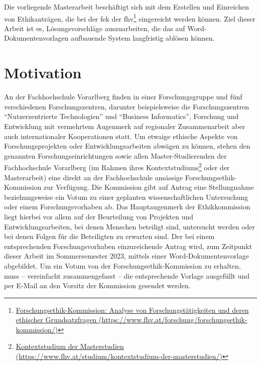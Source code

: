 \documentclass[a4paper,12pt,twoside]{scrreprt}
\begin{document}
Die vorliegende Masterarbeit beschäftigt sich mit dem Erstellen und Einreichen von Ethikanträgen, die bei der \ac{fek} der \ac{fhv}\footnote{\href{https://www.fhv.at/forschung/forschungsethik-kommission/}{Forschungsethik-Kommission: Analyse von Forschungstätigkeiten und deren ethischer Grundsatzfragen (\url{https://www.fhv.at/forschung/forschungsethik-kommission/)}}} eingereicht werden können. Ziel dieser Arbeit ist es, Lösungsvorschläge auszuarbeiten, die das auf Word-Dokumentenvorlagen aufbauende System langfristig ablösen können.

\section{Motivation}
\label{sec:motivation}

An der Fachhochschule Vorarlberg finden in einer Forschungsgruppe und fünf verschiedenen Forschungszentren, darunter beispielsweise die Forschungszentren \enquote{Nutzerzentrierte Technologien} und \enquote{Business Informatics}, Forschung und Entwicklung mit vermehrtem Augenmerk auf regionaler Zusammenarbeit aber auch internationaler Kooperationen statt. \cite{fachhochschule_vorarlberg_gmbh_forschung_2021} Um etwaige ethische Aspekte von Forschungsprojekten oder Entwicklungsarbeiten abwägen zu können, stehen den genannten Forschungseinrichtungen sowie allen Master-Studierenden der Fachhochschule Vorarlberg (im Rahmen ihres Kontextstudiums\footnote{\href{https://www.fhv.at/studium/kontextstudium-der-masterstudien/}{Kontextstudium der Masterstudien (\url{https://www.fhv.at/studium/kontextstudium-der-masterstudien/)}}} oder der Masterarbeit) eine direkt an der Fachhochschule ansässige Forschungsethik-Kommission zur Verfügung. Die Kommission gibt auf Antrag eine Stellungnahme beziehungsweise ein Votum zu einer geplanten wissenschaftlichen Untersuchung oder einem Forschungsvorhaben ab. Das Hauptaugenmerk der Ethikkommission liegt hierbei vor allem auf der Beurteilung von Projekten und Entwicklungsarbeiten, bei denen Menschen beteiligt sind, untersucht werden oder bei denen Folgen für die Beteiligten zu erwarten sind. Der bei einem entsprechenden Forschungsvorhaben einzureichende Antrag wird, zum Zeitpunkt dieser Arbeit im Sommersemester 2023, mittels einer Word-Dokumentenvorlage abgebildet. Um ein Votum von der Forschungsethik-Kommission zu erhalten, muss -- vereinfacht zusammengefasst -- die entsprechende Vorlage ausgefüllt und per E-Mail an den Vorsitz der Kommission gesendet werden. \cite{fachhochschule_vorarlberg_gmbh_forschungsethik-kommission_2021}
\end{document}
